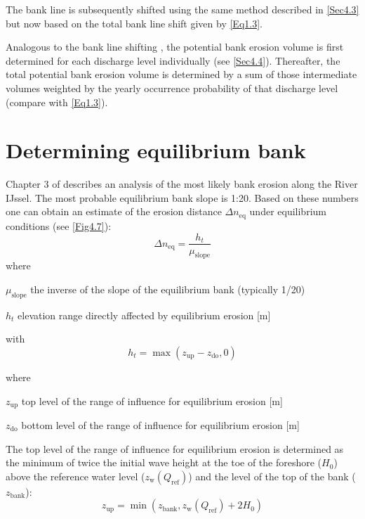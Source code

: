 The bank line is subsequently shifted using the same method described in \autoref{Sec4.3} but now based on the total bank line shift given by \autoref{Eq1.3}.

Analogous to the bank line shifting , the potential bank erosion volume is first determined for each discharge level individually (see \autoref{Sec4.4}).
Thereafter, the total potential bank erosion volume is determined by a sum of those intermediate volumes weighted by the yearly occurrence probability of that discharge level (compare with \autoref{Eq1.3}).

\section{Determining equilibrium bank}\label{Sec4.6}

Chapter 3 of \citet{MarkSBMV11} describes an analysis of the most likely bank erosion along the River IJssel.
The most probable equilibrium bank slope is 1:20.
Based on these numbers one can obtain an estimate of the erosion distance $\Delta n_\text{eq}$ under equilibrium conditions (see \autoref{Fig4.7}):
%
\begin{equation}
\Delta n_\text{eq} = \frac{h_t}{\mu_\text{slope}}
\end{equation}
%
where
\begin{symbollist}
\item[ $\mu_\text{slope}$] the inverse of the slope of the equilibrium bank (typically 1/20)
\item[$h_t$] elevation range directly affected by equilibrium erosion [m]
\end{symbollist}

with
\begin{equation}
h_t = \max (z_\text{up} - z_\text{do}, 0)
\end{equation}

where
\begin{symbollist}
\item[$z_\text{up}$] top level of the range of influence for equilibrium erosion [m]
\item[$z_\text{do}$] bottom level of the range of influence for equilibrium erosion [m]
\end{symbollist}

The top level of the range of influence for equilibrium erosion is determined as the minimum of twice the initial wave height at the toe of the foreshore ($H_0$) above the reference water level ($z_\text{w}(Q_\text{ref})$) and the level of the top of the bank ($z_\text{bank}$):
\begin{equation}
z_\text{up} = \min (z_\text{bank}, z_\text{w}(Q_\text{ref}) + 2 H_\text{0})
\label{eq_zup}
\end{equation}


